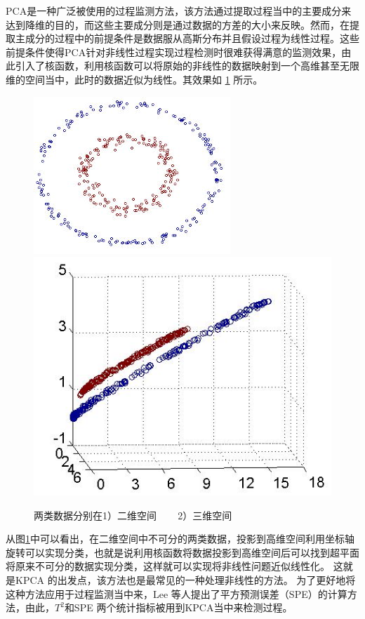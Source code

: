 PCA是一种广泛被使用的过程监测方法，该方法通过提取过程当中的主要成分来达到降维的目的，而这些主要成分则是通过数据的方差的大小来反映。然而，在提取主成分的过程中的前提条件是数据服从高斯分布并且假设过程为线性过程。这些前提条件使得PCA针对非线性过程实现过程检测时很难获得满意的监测效果，由此引入了核函数，利用核函数可以将原始的非线性的数据映射到一个高维甚至无限维的空间当中，此时的数据近似为线性。其效果如 \ref{Fig2D3D} 所示。
\begin{figure}[htb]
\centering
\includegraphics[scale=0.6]{./Pictures/kernel2D.jpg}
\includegraphics[scale=0.6]{./Pictures/kernel3D.jpg}
\caption{两类数据分别在1）二维空间 ~~~ 2）三维空间}
\label{Fig2D3D}
\end{figure}
从图\ref{Fig2D3D}中可以看出，在二维空间中不可分的两类数据，投影到高维空间利用坐标轴旋转可以实现分类，也就是说利用核函数将数据投影到高维空间后可以找到超平面将原来不可分的数据实现分类，这样就可以实现将非线性问题近似线性化。
这就是KPCA 的出发点，该方法也是最常见的一种处理非线性的方法。
为了更好地将这种方法应用于过程监测当中来，Lee 等人提出了平方预测误差（SPE）的计算方法，由此，$T^2$和SPE 两个统计指标被用到KPCA当中来检测过程。
